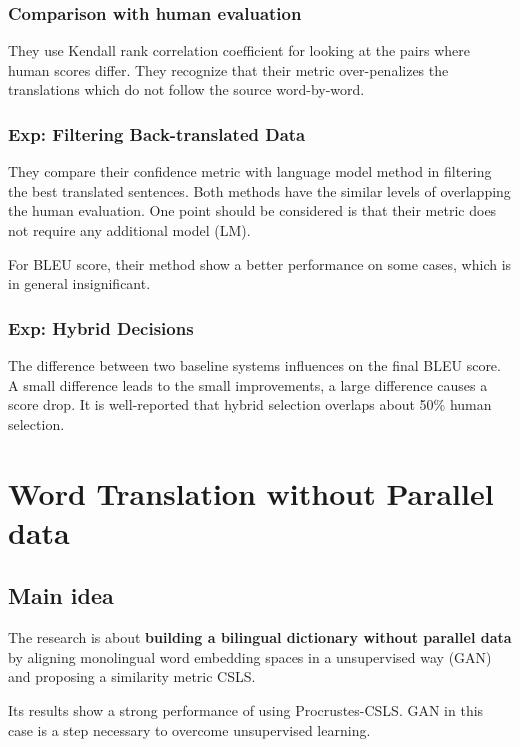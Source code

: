 \documentclass{article}
\begin{document}
\subsubsection{Comparison with human evaluation}
They use Kendall rank correlation coefficient for looking at the pairs where human scores differ. They recognize that their metric over-penalizes the translations which do not follow the source word-by-word.
\subsubsection{Exp: Filtering Back-translated Data}
They compare their confidence metric with language model method in filtering the best translated sentences. Both methods have the similar levels of overlapping the human evaluation. One point should be considered is that their metric does not require any additional model (LM).

For BLEU score, their method show a better performance on some cases, which is in general insignificant. 

\subsubsection{Exp: Hybrid Decisions}
The difference between two baseline systems influences on the final BLEU score. A small difference leads to the small improvements, a large difference causes a score drop. It is well-reported that hybrid selection overlaps about 50\% human selection.


\section{Word Translation without Parallel data \citep{Conneau2017Word}}

\subsection{Main idea}
The research is about \textbf{building a bilingual dictionary without parallel data} by aligning monolingual word embedding spaces in a unsupervised way (GAN) and proposing a similarity metric CSLS.

Its results show a strong performance of using Procrustes-CSLS. GAN in this case is a step necessary to overcome unsupervised learning. 
\end{document}

